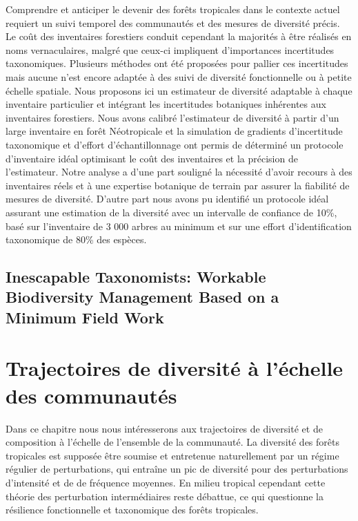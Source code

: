 \documentclass[
  11pt,
  french,
  A4paper,
  extrafontsizes,onecolumn,openright
  ]{memoir}
\begin{document}
Comprendre et anticiper le devenir des forêts tropicales dans le
contexte actuel requiert un suivi temporel des communautés et des
mesures de diversité précis. Le coût des inventaires forestiers conduit
cependant la majorités à être réalisés en noms vernaculaires, malgré que
ceux-ci impliquent d'importances incertitudes taxonomiques. Plusieurs
méthodes ont été proposées pour pallier ces incertitudes mais aucune
n'est encore adaptée à des suivi de diversité fonctionnelle ou à petite
échelle spatiale. Nous proposons ici un estimateur de diversité
adaptable à chaque inventaire particulier et intégrant les incertitudes
botaniques inhérentes aux inventaires forestiers. Nous avons calibré
l'estimateur de diversité à partir d'un large inventaire en forêt
Néotropicale et la simulation de gradients d'incertitude taxonomique et
d'effort d'échantillonnage ont permis de déterminé un protocole
d'inventaire idéal optimisant le coût des inventaires et la précision de
l'estimateur. Notre analyse a d'une part souligné la nécessité d'avoir
recours à des inventaires réels et à une expertise botanique de terrain
par assurer la fiabilité de mesures de diversité. D'autre part nous
avons pu identifié un protocole idéal assurant une estimation de la
diversité avec un intervalle de confiance de 10\%, basé sur l'inventaire
de 3 000 arbres au minimum et sur une effort d'identification
taxonomique de 80\% des espèces.

\newpage

\section*{Inescapable Taxonomists: Workable Biodiversity Management
Based on a Minimum Field
Work}\label{inescapable-taxonomists-workable-biodiversity-management-based-on-a-minimum-field-work}

\chapter{Trajectoires de diversité à l'échelle des
communautés}\label{trajectoires-de-diversite-a-lechelle-des-communautes}

Dans ce chapitre nous nous intéresserons aux trajectoires de diversité
et de composition à l'échelle de l'ensemble de la communauté. La
diversité des forêts tropicales est supposée être soumise et entretenue
naturellement par un régime régulier de perturbations, qui entraîne un
pic de diversité pour des perturbations d'intensité et de de fréquence
moyennes. En milieu tropical cependant cette théorie des perturbation
intermédiaires reste débattue, ce qui questionne la résilience
fonctionnelle et taxonomique des forêts tropicales.
\end{document}

